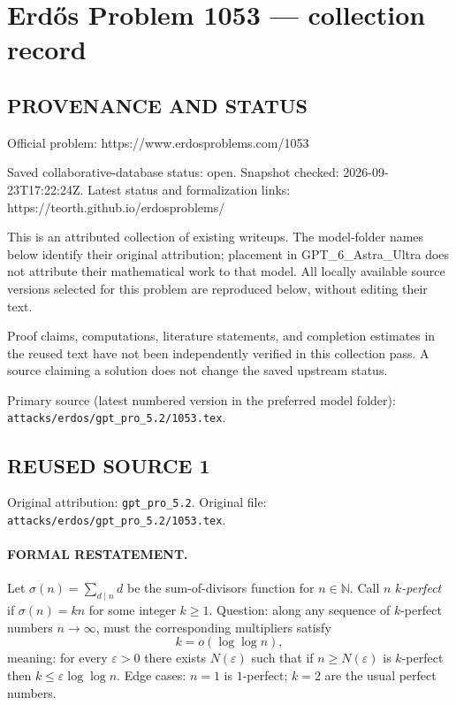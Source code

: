 \section*{Erd\H{o}s Problem 1053 --- collection record}

\subsection*{PROVENANCE AND STATUS}
Official problem: https://www.erdosproblems.com/1053

Saved collaborative-database status: open.
Snapshot checked: 2026-09-23T17:22:24Z.
Latest status and formalization links: https://teorth.github.io/erdosproblems/

This is an attributed collection of existing writeups. The model-folder names below identify their original attribution; placement in GPT\_6\_Astra\_Ultra does not attribute their mathematical work to that model. All locally available source versions selected for this problem are reproduced below, without editing their text.

Proof claims, computations, literature statements, and completion estimates in the reused text have not been independently verified in this collection pass. A source claiming a solution does not change the saved upstream status.

Primary source (latest numbered version in the preferred model folder): \texttt{attacks/erdos/gpt\_pro\_5.2/1053.tex}.

\subsection*{REUSED SOURCE 1}
Original attribution: \texttt{gpt\_pro\_5.2}.
Original file: \texttt{attacks/erdos/gpt\_pro\_5.2/1053.tex}.



\paragraph{FORMAL RESTATEMENT.}
Let $\sigma(n)=\sum_{d\mid n} d$ be the sum-of-divisors function for $n\in\mathbb{N}$.
Call $n$ \emph{$k$-perfect} if $\sigma(n)=k n$ for some integer $k\ge 1$.
Question: along any sequence of $k$-perfect numbers $n\to\infty$, must the corresponding multipliers satisfy
\[
k = o(\log\log n),
\]
meaning: for every $\varepsilon>0$ there exists $N(\varepsilon)$ such that if $n\ge N(\varepsilon)$ is $k$-perfect then $k\le \varepsilon\log\log n$.
Edge cases: $n=1$ is $1$-perfect; $k=2$ are the usual perfect numbers.

